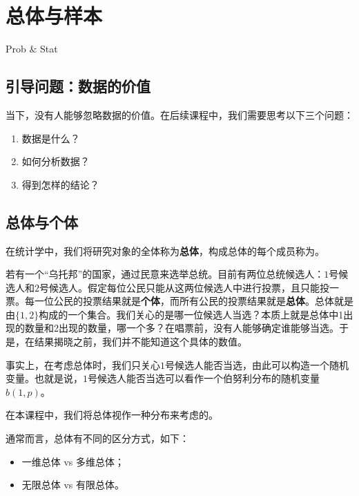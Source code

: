 \chapter{总体与样本}

\begin{introduction}
  \item Prob $\&$ Stat
\end{introduction}

\section{引导问题：数据的价值}
\begin{problem}
当下，没有人能够忽略数据的价值。在后续课程中，我们需要思考以下三个问题：
\begin{enumerate}
    \item 数据是什么？
    \item 如何分析数据？
    \item 得到怎样的结论？
\end{enumerate}
\end{problem}

\section{总体与个体}

在统计学中，我们将研究对象的全体称为\textbf{总体}，构成总体的每个成员称为。

\begin{example}[（总统选举）]
若有一个“乌托邦”的国家，通过民意来选举总统。目前有两位总统候选人：$1$号候选人和$2$号候选人。假定每位公民只能从这两位候选人中进行投票，且只能投一票。每一位公民的投票结果就是\textbf{个体}，而所有公民的投票结果就是\textbf{总体}。总体就是由$\{1,2\}$构成的一个集合。我们关心的是哪一位候选人当选？本质上就是总体中1出现的数量和2出现的数量，哪一个多？在唱票前，没有人能够确定谁能够当选。于是，在结果揭晓之前，我们并不能知道这个具体的数值。

事实上，在考虑总体时，我们只关心$1$号候选人能否当选，由此可以构造一个随机变量。也就是说，$1$号候选人能否当选可以看作一个伯努利分布的随机变量$b(1,p)$。
\end{example}
\begin{remark}
    在本课程中，我们将总体视作一种分布来考虑的。
    
    通常而言，总体有不同的区分方式，如下：
    \begin{itemize}
        \item 一维总体 vs 多维总体；
        \item 无限总体 vs 有限总体。
    \end{itemize}
\end{remark}
